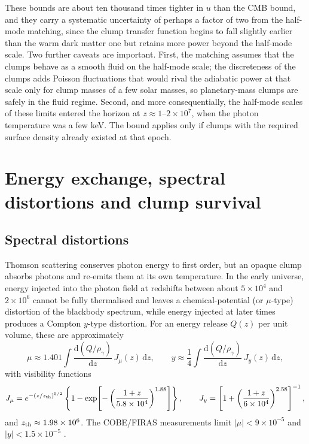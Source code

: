 \documentclass[11pt,a4paper]{article}
\newcommand{\dd}{\mathrm{d}}
\begin{document}
These bounds are about ten thousand times tighter in $u$ than the CMB bound, and they carry a systematic uncertainty of perhaps a factor of two from the half-mode matching, since the clump transfer function begins to fall slightly earlier than the warm dark matter one but retains more power beyond the half-mode scale. Two further caveats are important. First, the matching assumes that the clumps behave as a smooth fluid on the half-mode scale; the discreteness of the clumps adds Poisson fluctuations that would rival the adiabatic power at that scale only for clump masses of a few solar masses, so planetary-mass clumps are safely in the fluid regime. Second, and more consequentially, the half-mode scales of these limits entered the horizon at $z\approx 1$--$2\times10^{7}$, when the photon temperature was a few keV. The bound applies only if clumps with the required surface density already existed at that epoch.

\section{Energy exchange, spectral distortions and clump survival}
\label{sec:survival}

\subsection{Spectral distortions}

Thomson scattering conserves photon energy to first order, but an opaque clump absorbs photons and re-emits them at its own temperature. In the early universe, energy injected into the photon field at redshifts between about $5\times10^4$ and $2\times10^6$ cannot be fully thermalised and leaves a chemical-potential (or $\mu$-type) distortion of the blackbody spectrum, while energy injected at later times produces a Compton $y$-type distortion. For an energy release $Q(z)$ per unit volume, these are approximately \citep{Chluba2016}
\begin{equation}
\mu \approx 1.401\int \frac{\dd (Q/\rho_\gamma)}{\dd z}\,J_\mu(z)\,\dd z,\qquad
y \approx \frac14\int \frac{\dd (Q/\rho_\gamma)}{\dd z}\,J_y(z)\,\dd z,
\end{equation}
with visibility functions
\begin{equation}
J_\mu = e^{-(z/z_{\rm th})^{5/2}}\left\{1 - \exp\!\left[-\left(\frac{1+z}{5.8\times10^4}\right)^{1.88}\right]\right\},\qquad
J_y = \left[1+\left(\frac{1+z}{6\times10^4}\right)^{2.58}\right]^{-1},
\end{equation}
and $z_{\rm th}\approx1.98\times10^6$. The COBE/FIRAS measurements limit $|\mu|<9\times10^{-5}$ and $|y|<1.5\times10^{-5}$ \citep{Fixsen1996}.
\end{document}
